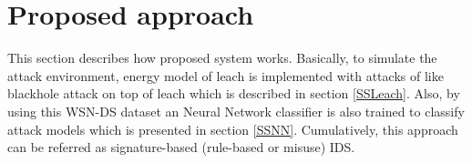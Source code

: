 \section{Proposed approach} \label{SPA}
This section describes how proposed system works. Basically, to simulate the attack environment, energy model of leach is implemented with attacks of like blackhole attack on top of leach which is described in section \ref{SSLeach}. Also, by using this WSN-DS dataset an Neural Network classifier is also trained to classify attack models which is presented in section \ref{SSNN}. Cumulatively, this approach can be referred as signature-based (rule-based or misuse) IDS.
